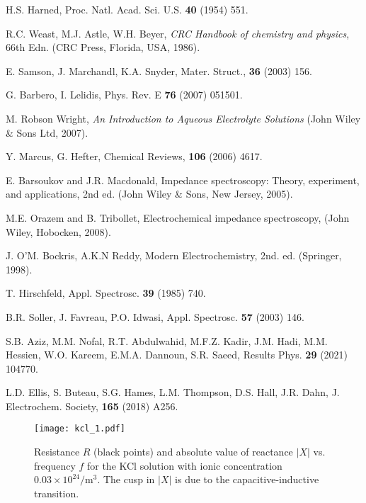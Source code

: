 \documentclass[preprint,aps,pre]{revtex4}
\begin{document}
\begin{thebibliography}{100}
 H.S. Harned, Proc. Natl. Acad. Sci. U.S. \textbf{40} (1954) 551.

 R.C. Weast, M.J. Astle, W.H. Beyer, \textit{CRC Handbook of
chemistry and physics}, 66th Edn. (CRC Press, Florida, USA, 1986).

 E. Samson, J. Marchandl, K.A. Snyder, Mater. Struct., \textbf{36} (2003) 156.

 G. Barbero, I. Lelidis, Phys. Rev. E \textbf{76} (2007) 051501.

 M. Robson Wright, \textit{An Introduction to Aqueous Electrolyte Solutions} (John Wiley \& Sons Ltd, 2007).

 Y. Marcus, G. Hefter, Chemical Reviews, \textbf{106} (2006) 4617.

 E. Barsoukov and J.R. Macdonald, Impedance spectroscopy: Theory, experiment, and applications, 2nd ed. (John Wiley \& Sons, New Jersey, 2005).

 M.E. Orazem and B. Tribollet, Electrochemical impedance spectroscopy, (John Wiley, Hobocken, 2008).

 J. O'M. Bockris, A.K.N Reddy, Modern Electrochemistry, 2nd. ed. (Springer, 1998).

 T. Hirschfeld, Appl. Spectrosc. \textbf{39} (1985) 740.

 B.R. Soller, J. Favreau, P.O. Idwasi, Appl. Spectrosc. \textbf{57} (2003) 146.

 S.B. Aziz, M.M. Nofal, R.T. Abdulwahid, M.F.Z. Kadir,
J.M. Hadi, M.M. Hessien, W.O. Kareem, E.M.A. Dannoun, S.R. Saeed, Results Phys. \textbf{29} (2021) 104770.

 L.D. Ellis, S. Buteau, S.G. Hames, L.M. Thompson, D.S. Hall, J.R. Dahn, J. Electrochem. Society, \textbf{165}  (2018) A256.



\end{thebibliography}

\newpage

\begin{figure}[htb]
	\texttt{[image: kcl\_1.pdf]}
	\caption{Resistance $R$ (black points) and absolute value of reactance $\left | X \right|$ vs. frequency $f$ for the KCl solution with ionic concentration $0.03\times 10^{24}/\mathrm{m^3}$. The cusp in $\left | X \right|$ is due to the capacitive-inductive transition.}
	\label{RX1}
\end{figure}
\end{document}
